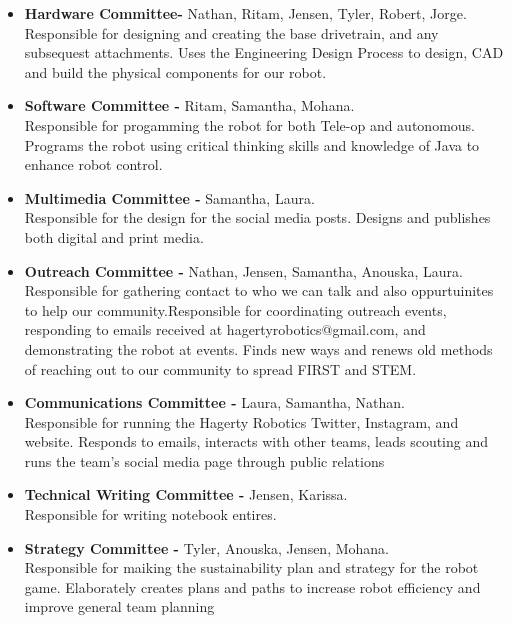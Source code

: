 
\begin{itemize}

\item \textbf{Hardware Committee-} Nathan, Ritam, Jensen, Tyler, Robert, Jorge. \\ Responsible for designing and creating the base drivetrain, and any subsequest attachments. Uses the Engineering Design Process to design, CAD and build the physical components for our robot.

\item \textbf{Software Committee -} Ritam, Samantha, Mohana.  \\ Responsible for progamming the robot for both Tele-op and autonomous. Programs the robot using critical thinking skills and knowledge of Java to enhance robot control.

\item \textbf{Multimedia Committee -} Samantha, Laura. \\Responsible for the design for the social media posts. Designs and publishes both digital and print media.

\item \textbf{Outreach Committee -} Nathan, Jensen, Samantha, Anouska, Laura. \\  Responsible for gathering contact to who we can talk and also oppurtuinites to help our community.Responsible for coordinating outreach events, responding to emails received at hagertyrobotics@gmail.com, and demonstrating the robot at events. Finds new ways and renews old methods of reaching out to our community to spread FIRST and STEM.

\item \textbf{Communications Committee -} Laura, Samantha, Nathan. \\ 
Responsible for running the Hagerty Robotics Twitter, Instagram, and website. Responds to emails, interacts with other teams, leads scouting and runs the team's social media page through public relations 

\item \textbf{Technical Writing Committee -} Jensen, Karissa. \\
Responsible for writing notebook entires. 

\item \textbf{Strategy Committee -} Tyler, Anouska, Jensen, Mohana. \\ Responsible for maiking the sustainability plan and strategy for the robot game. Elaborately creates plans and paths to increase robot efficiency and improve general team planning


\end{itemize} 
